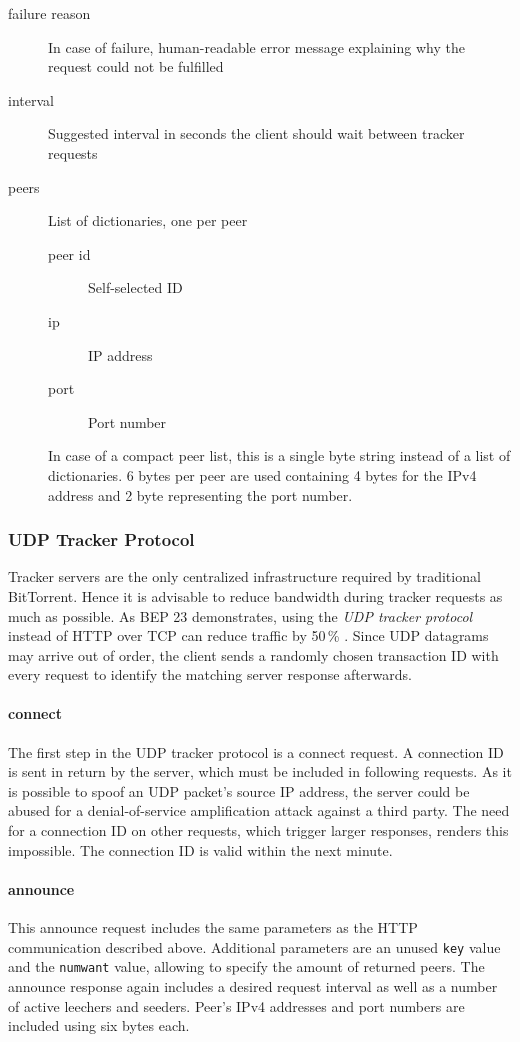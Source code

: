 \documentclass[10pt, a4paper]{scrartcl} %
\renewcommand{\_}{\origunderscore\allowbreak}
\begin{document}
\begin{description}
  \item[failure reason] In case of failure, human-readable error message explaining why the request could not be fulfilled
  \item[interval] Suggested interval in seconds the client should wait between tracker requests
  \item[peers] List of dictionaries, one per peer
  \begin{description}
    \item[peer id] Self-selected ID
    \item[ip] IP address
    \item[port] Port number
  \end{description}

  In case of a compact peer list, this is a single byte string instead of a list of dictionaries. 6 bytes per peer are used containing 4 bytes for the IPv4 address and 2 byte representing the port number.
\end{description}

\subsubsection{UDP Tracker Protocol}
Tracker servers are the only centralized infrastructure required by traditional BitTorrent. Hence it is advisable to reduce bandwidth during tracker requests as much as possible. As BEP 23 demonstrates, using the \emph{UDP tracker protocol} instead of HTTP over TCP can reduce traffic by 50\,\% \cite{bep15}. Since UDP datagrams may arrive out of order, the client sends a randomly chosen transaction ID with every request to identify the matching server response afterwards.

\paragraph{connect}
The first step in the UDP tracker protocol is a connect request. A connection ID is sent in return by the server, which must be included in following requests. As it is possible to spoof an UDP packet's source IP address, the server could be abused for a denial-of-service amplification attack against a third party. The need for a connection ID on other requests, which trigger larger responses, renders this impossible. The connection ID is valid within the next minute.

\paragraph{announce}
This announce request includes the same parameters as the HTTP communication described above. Additional parameters are an unused \texttt{key} value and the \texttt{num\_want} value, allowing to specify the amount of returned peers. The announce response again includes a desired request interval as well as a number of active leechers and seeders. Peer's IPv4 addresses and port numbers are included using six bytes each.
\end{document}
